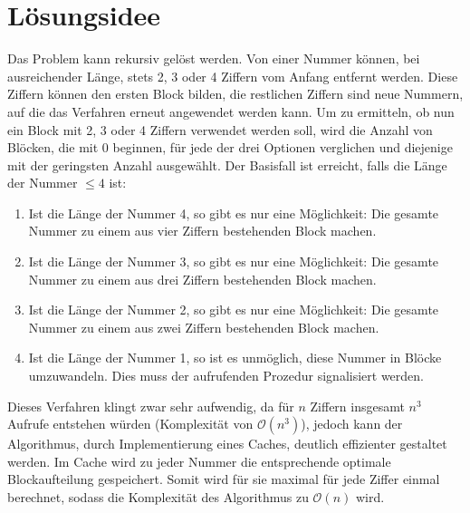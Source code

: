 \documentclass[a4paper,10pt,ngerman]{scrartcl}
\title{\Aufgabe}
\author{\Name\\Team-ID: \Einsendenummer}
\date{\today}
\begin{document}
\maketitle
\tableofcontents

\section{Lösungsidee}
Das Problem kann rekursiv gelöst werden.
Von einer Nummer können, bei ausreichender Länge, stets 2, 3 oder 4 Ziffern vom Anfang entfernt werden.
Diese Ziffern können den ersten Block bilden, die restlichen Ziffern sind neue Nummern, auf die das Verfahren erneut angewendet werden kann.
Um zu ermitteln, ob nun ein Block mit 2, 3 oder 4 Ziffern verwendet werden soll, wird die Anzahl von Blöcken, die mit 0 beginnen, für jede der drei Optionen verglichen und diejenige mit der geringsten Anzahl ausgewählt.
Der Basisfall ist erreicht, falls die Länge der Nummer $\le 4$ ist:
\begin{enumerate}
    \item Ist die Länge der Nummer 4, so gibt es nur eine Möglichkeit: Die gesamte Nummer zu einem aus vier Ziffern bestehenden Block machen.
    \item Ist die Länge der Nummer 3, so gibt es nur eine Möglichkeit: Die gesamte Nummer zu einem aus drei Ziffern bestehenden Block machen.
    \item Ist die Länge der Nummer 2, so gibt es nur eine Möglichkeit: Die gesamte Nummer zu einem aus zwei Ziffern bestehenden Block machen.
    \item Ist die Länge der Nummer 1, so ist es unmöglich, diese Nummer in Blöcke umzuwandeln. Dies muss der aufrufenden Prozedur signalisiert werden.
\end{enumerate}

Dieses Verfahren klingt zwar sehr aufwendig, da für $n$ Ziffern insgesamt $n^3$ Aufrufe entstehen würden (Komplexität von $\mathcal{O}(n^3)$), jedoch kann der Algorithmus, durch Implementierung eines Caches, deutlich effizienter gestaltet werden.
Im Cache wird zu jeder Nummer die entsprechende optimale Blockaufteilung gespeichert.
Somit wird für sie maximal für jede Ziffer einmal berechnet, sodass die Komplexität des Algorithmus zu $\mathcal{O}(n)$ wird.
\end{document}
